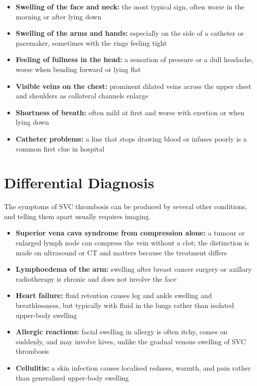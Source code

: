 \begin{itemize}
    \item \textbf{Swelling of the face and neck:} the most typical sign, often worse in the morning or after lying down
    \item \textbf{Swelling of the arms and hands:} especially on the side of a catheter or pacemaker, sometimes with the rings feeling tight
    \item \textbf{Feeling of fullness in the head:} a sensation of pressure or a dull headache, worse when bending forward or lying flat
    \item \textbf{Visible veins on the chest:} prominent dilated veins across the upper chest and shoulders as collateral channels enlarge
    \item \textbf{Shortness of breath:} often mild at first and worse with exertion or when lying down
    \item \textbf{Catheter problems:} a line that stops drawing blood or infuses poorly is a common first clue in hospital
\end{itemize}

\section*{Differential Diagnosis}
The symptoms of SVC thrombosis can be produced by several other conditions, and telling them apart usually requires imaging.

\begin{itemize}
    \item \textbf{Superior vena cava syndrome from compression alone:} a tumour or enlarged lymph node can compress the vein without a clot; the distinction is made on ultrasound or CT and matters because the treatment differs
    \item \textbf{Lymphoedema of the arm:} swelling after breast cancer surgery or axillary radiotherapy is chronic and does not involve the face
    \item \textbf{Heart failure:} fluid retention causes leg and ankle swelling and breathlessness, but typically with fluid in the lungs rather than isolated upper-body swelling
    \item \textbf{Allergic reactions:} facial swelling in allergy is often itchy, comes on suddenly, and may involve hives, unlike the gradual venous swelling of SVC thrombosis
    \item \textbf{Cellulitis:} a skin infection causes localised redness, warmth, and pain rather than generalised upper-body swelling
\end{itemize}

